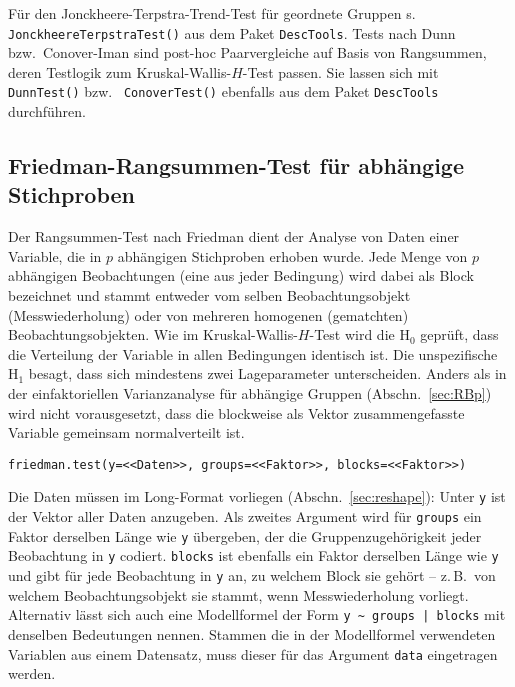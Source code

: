 Für den Jonckheere-Terpstra-Trend-Test für geordnete Gruppen s.\  \lstinline!JonckheereTerpstraTest()! aus dem Paket  \lstinline!DescTools!. Tests nach Dunn bzw.\ Conover-Iman sind post-hoc Paarvergleiche auf Basis von Rangsummen, deren Testlogik zum Kruskal-Wallis-$H$-Test passen. Sie lassen sich mit  \lstinline!DunnTest()! bzw.\  \lstinline!ConoverTest()! ebenfalls aus dem Paket  \lstinline!DescTools! durchführen.

\subsection{Friedman-Rangsummen-Test für abhängige Stichproben}
\label{sec:friedman}

Der Rangsummen-Test nach Friedman dient der Analyse von Daten einer Variable, die in $p$ abhängigen Stichproben erhoben wurde. Jede Menge von $p$ abhängigen Beobachtungen (eine aus jeder Bedingung) wird dabei als Block bezeichnet und stammt entweder vom selben Beobachtungsobjekt (Messwiederholung) oder von mehreren homogenen (gematchten) Beobachtungsobjekten. Wie im Kruskal-Wallis-$H$-Test wird die $\text{H}_{0}$ geprüft, dass die Verteilung der Variable in allen Bedingungen identisch ist. Die unspezifische $\text{H}_{1}$ besagt, dass sich mindestens zwei Lageparameter unterscheiden. Anders als in der einfaktoriellen Varianzanalyse für abhängige Gruppen (Abschn.\ \ref{sec:RBp}) wird nicht vorausgesetzt, dass die blockweise als Vektor zusammengefasste Variable gemeinsam normalverteilt ist.
\begin{lstlisting}
friedman.test(y=<<Daten>>, groups=<<Faktor>>, blocks=<<Faktor>>)
\end{lstlisting}

Die Daten müssen im Long-Format vorliegen (Abschn.\ \ref{sec:reshape}): Unter \lstinline!y! ist der Vektor aller Daten anzugeben. Als zweites Argument wird für \lstinline!groups! ein Faktor derselben Länge wie \lstinline!y! übergeben, der die Gruppenzugehörigkeit jeder Beobachtung in \lstinline!y! codiert. \lstinline!blocks! ist ebenfalls ein Faktor derselben Länge wie \lstinline!y! und gibt für jede Beobachtung in \lstinline!y! an, zu welchem Block sie gehört -- z.\,B.\ von welchem Beobachtungsobjekt sie stammt, wenn Messwiederholung vorliegt. Alternativ lässt sich auch eine Modellformel der Form \lstinline!y ~ groups | blocks! mit denselben Bedeutungen nennen. Stammen die in der Modellformel verwendeten Variablen aus einem Datensatz, muss dieser für das Argument \lstinline!data! eingetragen werden.

